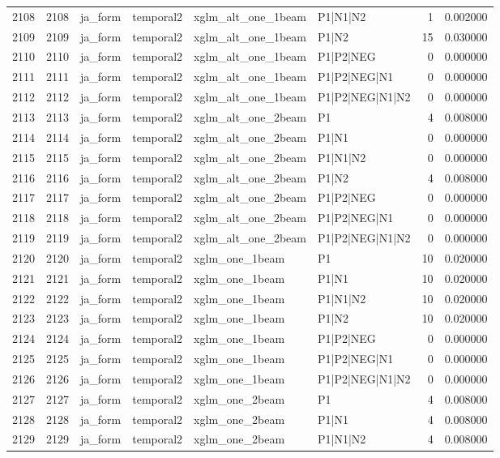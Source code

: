 \begin{tabular}{lrllllrr}
2108 & 2108 & ja_form & temporal2 & xglm_alt_one_1beam & P1|N1|N2 & 1 & 0.002000 \\
2109 & 2109 & ja_form & temporal2 & xglm_alt_one_1beam & P1|N2 & 15 & 0.030000 \\
2110 & 2110 & ja_form & temporal2 & xglm_alt_one_1beam & P1|P2|NEG & 0 & 0.000000 \\
2111 & 2111 & ja_form & temporal2 & xglm_alt_one_1beam & P1|P2|NEG|N1 & 0 & 0.000000 \\
2112 & 2112 & ja_form & temporal2 & xglm_alt_one_1beam & P1|P2|NEG|N1|N2 & 0 & 0.000000 \\
2113 & 2113 & ja_form & temporal2 & xglm_alt_one_2beam & P1 & 4 & 0.008000 \\
2114 & 2114 & ja_form & temporal2 & xglm_alt_one_2beam & P1|N1 & 0 & 0.000000 \\
2115 & 2115 & ja_form & temporal2 & xglm_alt_one_2beam & P1|N1|N2 & 0 & 0.000000 \\
2116 & 2116 & ja_form & temporal2 & xglm_alt_one_2beam & P1|N2 & 4 & 0.008000 \\
2117 & 2117 & ja_form & temporal2 & xglm_alt_one_2beam & P1|P2|NEG & 0 & 0.000000 \\
2118 & 2118 & ja_form & temporal2 & xglm_alt_one_2beam & P1|P2|NEG|N1 & 0 & 0.000000 \\
2119 & 2119 & ja_form & temporal2 & xglm_alt_one_2beam & P1|P2|NEG|N1|N2 & 0 & 0.000000 \\
2120 & 2120 & ja_form & temporal2 & xglm_one_1beam & P1 & 10 & 0.020000 \\
2121 & 2121 & ja_form & temporal2 & xglm_one_1beam & P1|N1 & 10 & 0.020000 \\
2122 & 2122 & ja_form & temporal2 & xglm_one_1beam & P1|N1|N2 & 10 & 0.020000 \\
2123 & 2123 & ja_form & temporal2 & xglm_one_1beam & P1|N2 & 10 & 0.020000 \\
2124 & 2124 & ja_form & temporal2 & xglm_one_1beam & P1|P2|NEG & 0 & 0.000000 \\
2125 & 2125 & ja_form & temporal2 & xglm_one_1beam & P1|P2|NEG|N1 & 0 & 0.000000 \\
2126 & 2126 & ja_form & temporal2 & xglm_one_1beam & P1|P2|NEG|N1|N2 & 0 & 0.000000 \\
2127 & 2127 & ja_form & temporal2 & xglm_one_2beam & P1 & 4 & 0.008000 \\
2128 & 2128 & ja_form & temporal2 & xglm_one_2beam & P1|N1 & 4 & 0.008000 \\
2129 & 2129 & ja_form & temporal2 & xglm_one_2beam & P1|N1|N2 & 4 & 0.008000 \\

\end{tabular}
